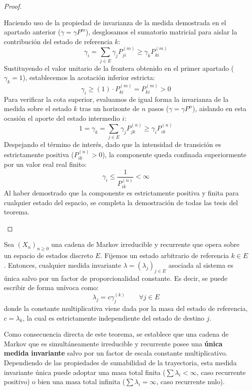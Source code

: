 \documentclass[10pt]{book}
\begin{document}
\begin{teo}
\begin{proof}
\begin{description}
            Haciendo uso de la propiedad de invarianza de la medida demostrada en el apartado anterior ($\gamma = \gamma P^m$), desglosamos el sumatorio matricial para aislar la contribución del estado de referencia $k$:
            \[ 
            \gamma_i = \sum_{j \in E} \gamma_j P_{ji}^{(m)} \geq \gamma_k P_{ki}^{(m)} 
            \]
            Sustituyendo el valor unitario de la frontera obtenido en el primer apartado ($\gamma_k = 1$), establecemos la acotación inferior estricta:
            \[
            \gamma_i \geq (1) \cdot P_{ki}^{(m)} = P_{ki}^{(m)} > 0
            \]
            Para verificar la cota superior, evaluamos de igual forma la invarianza de la medida sobre el estado $k$ tras un horizonte de $n$ pasos ($\gamma = \gamma P^n$), aislando en esta ocasión el aporte del estado intermedio $i$:
            \[ 
            1 = \gamma_k = \sum_{j \in E} \gamma_j P_{jk}^{(n)} \geq \gamma_i P_{ik}^{(n)} 
            \]
            Despejando el término de interés, dado que la intensidad de transición es estrictamente positiva ($P_{ik}^{(n)} > 0$), la componente queda confinada superiormente por un valor real real finito:
            \[ 
            \gamma_i \leq \frac{1}{P_{ik}^{(n)}} < \infty 
            \]
            Al haber demostrado que la componente es estrictamente positiva y finita para cualquier estado del espacio, se completa la demostración de todas las tesis del teorema.
    \end{description} 
\end{proof}
\end{teo}

\begin{teo}
    Sea $(X_n)_{n \geq 0}$ una cadena de Markov irreducible y recurrente que opera sobre un espacio de estados discreto $E$. Fijemos un estado arbitrario de referencia $k \in E$. Entonces, cualquier medida invariante $\lambda = (\lambda_j)_{j \in E}$ asociada al sistema es única salvo por un factor de proporcionalidad constante. Es decir, se puede escribir de forma unívoca como:
    \[ 
    \lambda_j = c \gamma_j^{(k)} \qquad \forall j \in E 
    \]
    donde la constante multiplicativa viene dada por la masa del estado de referencia, $c = \lambda_k$, la cual es estrictamente independiente del estado de destino $j$.
\end{teo}


\begin{observacion}
    Como consecuencia directa de este teorema, se establece que una cadena de Markov que es simultáneamente irreducible y recurrente posee una \textbf{única medida invariante} salvo por un factor de escala constante multiplicativo. Dependiendo de las propiedades de sumabilidad de la trayectoria, esta medida invariante única puede adoptar una masa total finita ($\sum \lambda_i < \infty$, caso recurrente positivo) o bien una masa total infinita ($\sum \lambda_i = \infty$, caso recurrente nulo). \\
\end{observacion}
\end{document}
